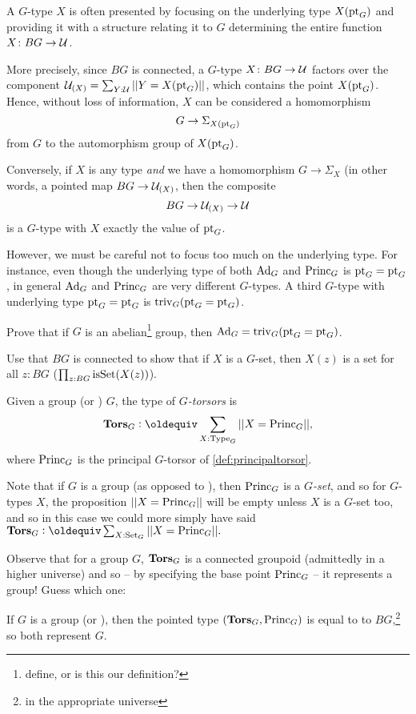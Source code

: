 \begin{remark}
  A $G$-type $X$ is often presented by focusing on the underlying type $X({\mathord{\mathrm{pt}}}_G)$  and providing it with a structure relating it to $G$ determining the entire function $X\colon BG\to\mathcal{U}$.

More precisely, since $BG$ is connected, a $G$-type $X\colon BG\to\mathcal{U}$ factors over the component $\mathcal{U}_{(X)}=\sum_{Y:\mathcal{U}}||Y=X({\mathord{\mathrm{pt}}}_G)||$, which contains the point $X({\mathord{\mathrm{pt}}}_G)$.  Hence, without loss of information, $X$ can be considered a homomorphism 
$$G\to\Sigma_{X({\mathord{\mathrm{pt}}}_G)}$$ from $G$ to the automorphism group of $X({\mathord{\mathrm{pt}}}_G)$.

Conversely, if $X$ is any type \emph{and} we have a homomorphism $G\to\Sigma_X$ (in other words, a pointed map $BG\to\mathcal{U}_{(X)}$, then the composite
$$BG\to \mathcal{U}_{(X)}\to \mathcal{U}$$
is a $G$-type with $X$ exactly the value of ${\mathord{\mathrm{pt}}}_G$.

However, we must be careful not to focus too much on the underlying type.  For instance, even though the underlying type of both $\mathrm{Ad}_G$ and $\mathrm{Princ}_G$ is ${\mathord{\mathrm{pt}}}_G={\mathord{\mathrm{pt}}}_G$, in general  $\mathrm{Ad}_G$ and $\mathrm{Princ}_G$  are very different $G$-types.  A third $G$-type with underlying type ${\mathord{\mathrm{pt}}}_G={\mathord{\mathrm{pt}}}_G$ is $\mathrm{triv}_G({\mathord{\mathrm{pt}}}_G={\mathord{\mathrm{pt}}}_G)$.
\end{remark}

\begin{xca}
  Prove that if $G$ is an abelian\footnote{define, or is this our definition?} group, then $\mathrm{Ad}_G=\mathrm{triv}_G({\mathord{\mathrm{pt}}}_G={\mathord{\mathrm{pt}}}_G)$.
\end{xca}
\begin{xca}
  Use that $BG$ is connected to show that if $X$ is a $G$-set, then $X(z)$ is a set for all $z:BG$ (\ie $\prod_{z:BG}\mathrm{isSet}(X(z))$).
\end{xca}
\begin{definition}
  Given a group (or \inftygp) $G$, the type of {\em$G$-torsors} is
$$\typetorsor_G\defequi\sum_{X:\Type_G}||X=\princ_G||,$$
where $\mathrm{Princ}_G$ is the principal $G$-torsor of \cref{def:principaltorsor}.
\end{definition}
\begin{remark}
  Note that if $G$ is a group (as opposed to \aninftygp), then $\mathrm{Princ}_G$ is a $G${\em-set}, and so for $G$-types $X$, the proposition $||X=\mathrm{Princ}_G||$ will be empty unless $X$ is a $G$-set too, and so in this case we could more simply have said $\typetorsor_G\defequi\sum_{X:\Set_G}||X=\princ_G||.$  

Observe that for a group $G$, $\mathbf{Tors}_G$ is a connected groupoid (admittedly in a higher universe) and so -- by specifying the base point $\mathrm{Princ}_G$ -- it represents a group!  Guess which one:
\end{remark}
\begin{lemma}\label{lem:BGbytorsor}
  If $G$ is a group (or \inftygp), then the pointed type $(\mathbf{Tors}_G,\mathrm{Princ}_G)$ is equal to to $BG$,\footnote{in the appropriate universe} so both represent $G$.
\end{lemma}

